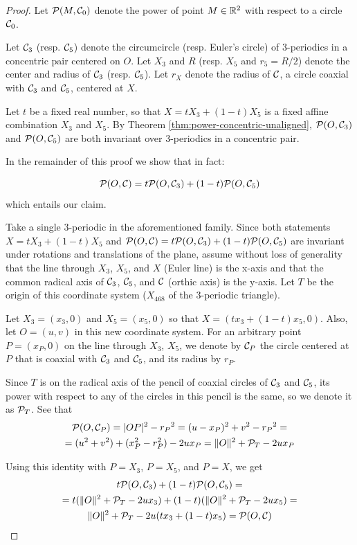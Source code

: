 \begin{proof}

Let $\P(M,\C_0)$ denote the power of point $M\in\R^2$ with respect to a circle $\C_0$.

Let $\C_3$ (resp. $\C_5$) denote the circumcircle (resp. Euler's circle) of 3-periodics in a concentric pair centered on $O$. Let $X_3$ and $R$ (resp. $X_5$ and $r_5=R/2$) denote the center and radius of $\C_3$ (resp. $\C_5$). Let $r_X$ denote the radius of $\C$, a circle coaxial with $\C_3$ and $\C_5$, centered at $X$.

Let $t$ be a fixed real number, so that $X=t X_3+(1-t)X_5$ is a fixed affine combination $X_3$ and $X_5$. By Theorem \ref{thm:power-concentric-unaligned}, $\P(O,\C_3)$ and $\P(O,\C_5)$ are both invariant over 3-periodics in a concentric pair.

In the remainder of this proof we show that in fact:

\[ \P(O,\C)=t\P(O,\C_3)+(1-t)\P(O,\C_5)\]
which entails our claim.

Take a single 3-periodic in the aforementioned family. Since both statements $X=t X_3+(1-t)X_5$ and $\P(O,\C)=t\P(O,\C_3)+(1-t)\P(O,\C_5)$ are invariant under rotations and translations of the plane, assume without loss of generality that the line through $X_3$, $X_5$, and $X$ (Euler line) is the x-axis and that the common radical axis of $\C_3$, $\C_5$, and $\C$ (orthic axis) is the y-axis. Let $T$ be the origin of this coordinate system ($X_{468}$ of the 3-periodic triangle).

Let $X_3=(x_3,0)$ and $X_5=(x_5,0)$ so that $X=(t x_3+(1-t)x_5,0)$. Also, let $O=(u,v)$ in this new coordinate system. For an arbitrary point $P=(x_P,0)$ on the line through $X_3$, $X_5$, we denote by $\C_P$ the circle centered at $P$ that is coaxial with $\C_3$ and $\C_5$, and its radius by $r_P$.

Since $T$ is on the radical axis of the pencil of coaxial circles of $\C_3$ and $\C_5$, its power with respect to any of the circles in this pencil is the same, so we denote it as $\P_T$. See that 
\begin{gather*}
    \P(O,\C_P)=|O P|^2-{r_P}^2= (u-x_P)^2+v^2-{r_P}^2=\\
    =(u^2+v^2)+(x_P^2-r_P^2)-2 u x_P= \|O\|^2+\P_T-2 u x_P
\end{gather*}

Using this identity with $P=X_3$, $P=X_5$, and $P=X$, we get
\begin{gather*}
    t\P(O,\C_3)+(1-t)\P(O,\C_5)=\\
    =t(\|O\|^2+\P_T-2 u x_3)+(1-t)(\|O\|^2+\P_T-2 u x_5)=\\
    \|O\|^2+\P_T-2 u (t x_3+(1-t)x_5)=\P(O,\C)
\end{gather*}
\end{proof}

